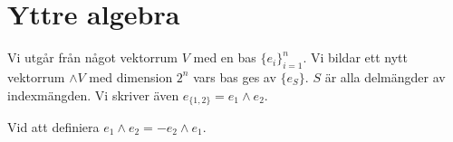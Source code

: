 \section{Yttre algebra}

Vi utgår från något vektorrum $V$ med en bas $\{e_{i}\}_{i = 1}^{n}$. Vi bildar ett nytt vektorrum $\wedge V$ med dimension $2^{n}$ vars bas ges av $\{e_{S}\}$. $S$ är alla delmängder av indexmängden. Vi skriver även $e_{\{1, 2\}} = e_{1}\wedge e_{2}$.

Vid att definiera $e_{1}\wedge e_{2} = -e_{2}\wedge e_{1}$.